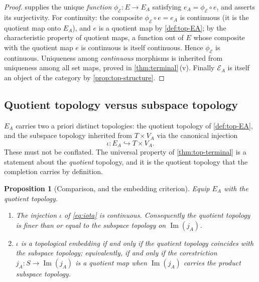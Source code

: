 \documentclass[11pt,reqno]{amsart}
\theoremstyle{plain}
\newtheorem{proposition}[theorem]{Proposition}
\theoremstyle{definition}
\theoremstyle{remark}
\numberwithin{equation}{section}
\DeclareMathOperator{\Image}{Im}
\begin{document}
\begin{proof}
 supplies the unique \emph{function} $\phi_{\mathcal E}\colon E\to E_A$ satisfying
$e_A=\phi_{\mathcal E}\circ e$, and asserts its surjectivity. For continuity: the composite
$\phi_{\mathcal E}\circ e=e_A$ is continuous (it is the quotient map onto $E_A$), and $e$ is a
quotient map by \cref{def:top-EA}; by the characteristic property of quotient maps, a function out of
$E$ whose composite with the quotient map $e$ is continuous is itself continuous. Hence
$\phi_{\mathcal E}$ is continuous. Uniqueness among \emph{continuous} morphisms is inherited from
uniqueness among all set maps, proved in \cref{thm:terminal}\,(v). Finally $\mathcal E_A$ is itself an
object of the category by \cref{prop:top-structure}.
\end{proof}

\subsection{Quotient topology versus subspace topology}

$E_A$ carries two a priori distinct topologies: the quotient topology of \cref{def:top-EA}, and the
subspace topology inherited from $T\times V_A$ via the canonical injection
\begin{equation}
\label{eq:iota}
\iota\colon E_A\hookrightarrow T\times V_A .
\end{equation}
These must not be conflated. The universal property of \cref{thm:top-terminal} is a statement about
the \emph{quotient} topology, and it is the quotient topology that the completion carries by
definition.

\begin{proposition}[Comparison, and the embedding criterion]
\label{prop:embedding}
Equip $E_A$ with the quotient topology.
\begin{enumerate}
\item\label{it:iota-cts} The injection $\iota$ of \eqref{eq:iota} is continuous. Consequently the
quotient topology is \emph{finer than or equal to} the subspace topology on $\Image(j_A)$.
\item\label{it:iota-embed} $\iota$ is a topological embedding if and only if the quotient topology
coincides with the subspace topology; equivalently, if and only if the corestriction
$j_A\colon S\to\Image(j_A)$ is a quotient map when $\Image(j_A)$ carries the product subspace
topology.
\end{enumerate}
\end{proposition}
\end{document}
